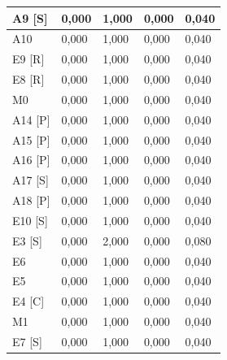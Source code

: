 \begin{table}[]
\begin{tabular}{|l|l|l|l|l|}
A9 {[}S{]}    & 0,000         & 1,000           & 0,000                     & 0,040                       \\ \hline
A10           & 0,000         & 1,000           & 0,000                     & 0,040                       \\ \hline
E9 {[}R{]}    & 0,000         & 1,000           & 0,000                     & 0,040                       \\ \hline
E8 {[}R{]}    & 0,000         & 1,000           & 0,000                     & 0,040                       \\ \hline
M0            & 0,000         & 1,000           & 0,000                     & 0,040                       \\ \hline
A14 {[}P{]}   & 0,000         & 1,000           & 0,000                     & 0,040                       \\ \hline
A15 {[}P{]}   & 0,000         & 1,000           & 0,000                     & 0,040                       \\ \hline
A16 {[}P{]}   & 0,000         & 1,000           & 0,000                     & 0,040                       \\ \hline
A17 {[}S{]}   & 0,000         & 1,000           & 0,000                     & 0,040                       \\ \hline
A18 {[}P{]}   & 0,000         & 1,000           & 0,000                     & 0,040                       \\ \hline
E10 {[}S{]}   & 0,000         & 1,000           & 0,000                     & 0,040                       \\ \hline
E3 {[}S{]}    & 0,000         & 2,000           & 0,000                     & 0,080                       \\ \hline
E6            & 0,000         & 1,000           & 0,000                     & 0,040                       \\ \hline
E5            & 0,000         & 1,000           & 0,000                     & 0,040                       \\ \hline
E4 {[}C{]}    & 0,000         & 1,000           & 0,000                     & 0,040                       \\ \hline
M1            & 0,000         & 1,000           & 0,000                     & 0,040                       \\ \hline
E7 {[}S{]}    & 0,000         & 1,000           & 0,000                     & 0,040                       \\ \hline
\end{tabular}
\end{table}

